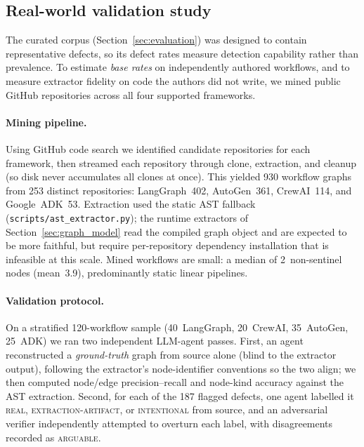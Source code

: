 \subsection{Real-world validation study}
\label{sec:realworld}

The curated corpus (Section~\ref{sec:evaluation}) was designed to contain
representative defects, so its defect rates measure detection capability rather
than prevalence. To estimate \emph{base rates} on independently authored
workflows, and to measure extractor fidelity on code the authors did not write,
we mined public GitHub repositories across all four supported frameworks.

\paragraph{Mining pipeline.}
Using GitHub code search we identified candidate repositories for each
framework, then streamed each repository through clone, extraction, and cleanup
(so disk never accumulates all clones at once). This yielded 930 workflow graphs
from 253 distinct repositories: LangGraph~402, AutoGen~361, CrewAI~114, and
Google~ADK~53. Extraction used the static AST fallback
(\texttt{scripts/ast\_extractor.py}); the runtime extractors of
Section~\ref{sec:graph_model} read the compiled graph object and are expected to
be more faithful, but require per-repository dependency installation that is
infeasible at this scale. Mined workflows are small: a median of 2~non-sentinel
nodes (mean~3.9), predominantly static linear pipelines.

\paragraph{Validation protocol.}
On a stratified 120-workflow sample (40~LangGraph, 20~CrewAI, 35~AutoGen,
25~ADK) we ran two independent LLM-agent passes. First, an agent reconstructed a
\emph{ground-truth} graph from source alone (blind to the extractor output),
following the extractor's node-identifier conventions so the two align; we then
computed node/edge precision--recall and node-kind accuracy against the AST
extraction. Second, for each of the 187 flagged defects, one agent labelled it
\textsc{real}, \textsc{extraction-artifact}, or \textsc{intentional} from
source, and an adversarial verifier independently attempted to overturn each
label, with disagreements recorded as \textsc{arguable}.

